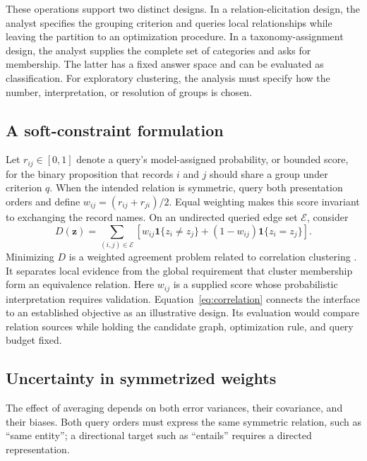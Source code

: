 \documentclass[11pt,a4paper]{article}
\newcommand{\ind}{\mathbf{1}}
\begin{document}
These operations support two distinct designs. In a relation-elicitation design, the analyst specifies the grouping criterion and queries local relationships while leaving the partition to an optimization procedure. In a taxonomy-assignment design, the analyst supplies the complete set of categories and asks for membership. The latter has a fixed answer space and can be evaluated as classification. For exploratory clustering, the analysis must specify how the number, interpretation, or resolution of groups is chosen.

\subsection{A soft-constraint formulation}

Let $r_{ij}\in[0,1]$ denote a query's model-assigned probability, or bounded score, for the binary proposition that records $i$ and $j$ should share a group under criterion $q$. When the intended relation is symmetric, query both presentation orders and define $w_{ij}=(r_{ij}+r_{ji})/2$. Equal weighting makes this score invariant to exchanging the record names. On an undirected queried edge set $\mathcal E$, consider
\begin{equation}
 D(\boldsymbol z)=\sum_{(i,j)\in\mathcal E}
 \left[w_{ij}\ind\{z_i\ne z_j\}
 +(1-w_{ij})\ind\{z_i=z_j\}\right].
 \label{eq:correlation}
\end{equation}
Minimizing $D$ is a weighted agreement problem related to correlation clustering \citep{bansal2004}. It separates local evidence from the global requirement that cluster membership form an equivalence relation. Here $w_{ij}$ is a supplied score whose probabilistic interpretation requires validation. Equation~\eqref{eq:correlation} connects the interface to an established objective as an illustrative design. Its evaluation would compare relation sources while holding the candidate graph, optimization rule, and query budget fixed.

\subsection{Uncertainty in symmetrized weights}\label{sec:weight-uncertainty}

The effect of averaging depends on both error variances, their covariance, and their biases. Both query orders must express the same symmetric relation, such as ``same entity''; a directional target such as ``entails'' requires a directed representation.
\end{document}
